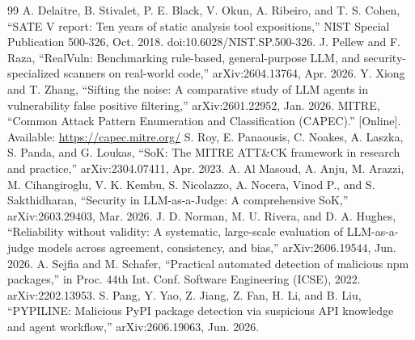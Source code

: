 \documentclass[conference]{IEEEtran}
\begin{document}
\begin{thebibliography}{99}
 A. Delaitre, B. Stivalet, P. E. Black, V. Okun, A. Ribeiro, and T. S. Cohen, ``SATE V report: Ten years of static analysis tool expositions,'' NIST Special Publication 500-326, Oct. 2018. doi:10.6028/NIST.SP.500-326.
 J. Pellew and F. Raza, ``RealVuln: Benchmarking rule-based, general-purpose LLM, and security-specialized scanners on real-world code,'' arXiv:2604.13764, Apr. 2026.
 Y. Xiong and T. Zhang, ``Sifting the noise: A comparative study of LLM agents in vulnerability false positive filtering,'' arXiv:2601.22952, Jan. 2026.
 MITRE, ``Common Attack Pattern Enumeration and Classification (CAPEC).'' [Online]. Available: \url{https://capec.mitre.org/}
 S. Roy, E. Panaousis, C. Noakes, A. Laszka, S. Panda, and G. Loukas, ``SoK: The MITRE ATT\&CK framework in research and practice,'' arXiv:2304.07411, Apr. 2023.
 A. Al Masoud, A. Anju, M. Arazzi, M. Cihangiroglu, V. K. Kembu, S. Nicolazzo, A. Nocera, Vinod P., and S. Sakthidharan, ``Security in LLM-as-a-Judge: A comprehensive SoK,'' arXiv:2603.29403, Mar. 2026.
 J. D. Norman, M. U. Rivera, and D. A. Hughes, ``Reliability without validity: A systematic, large-scale evaluation of LLM-as-a-judge models across agreement, consistency, and bias,'' arXiv:2606.19544, Jun. 2026.
 A. Sejfia and M. Schafer, ``Practical automated detection of malicious npm packages,'' in Proc. 44th Int. Conf. Software Engineering (ICSE), 2022. arXiv:2202.13953.
 S. Pang, Y. Yao, Z. Jiang, Z. Fan, H. Li, and B. Liu, ``PYPILINE: Malicious PyPI package detection via suspicious API knowledge and agent workflow,'' arXiv:2606.19063, Jun. 2026.
\end{thebibliography}
\end{document}
